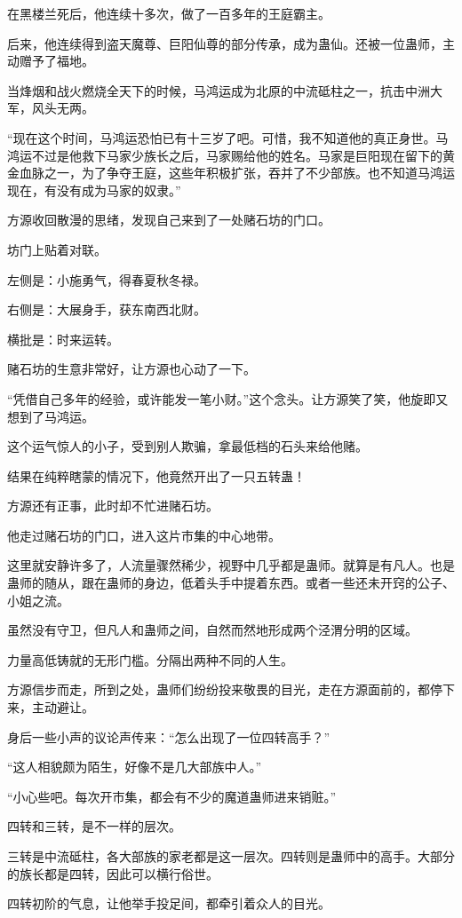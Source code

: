 \begin{this_body}
在黑楼兰死后，他连续十多次，做了一百多年的王庭霸主。

后来，他连续得到盗天魔尊、巨阳仙尊的部分传承，成为蛊仙。还被一位蛊师，主动赠予了福地。

当烽烟和战火燃烧全天下的时候，马鸿运成为北原的中流砥柱之一，抗击中洲大军，风头无两。

“现在这个时间，马鸿运恐怕已有十三岁了吧。可惜，我不知道他的真正身世。马鸿运不过是他救下马家少族长之后，马家赐给他的姓名。马家是巨阳现在留下的黄金血脉之一，为了争夺王庭，这些年积极扩张，吞并了不少部族。也不知道马鸿运现在，有没有成为马家的奴隶。”

方源收回散漫的思绪，发现自己来到了一处赌石坊的门口。

坊门上贴着对联。

左侧是：小施勇气，得春夏秋冬禄。

右侧是：大展身手，获东南西北财。

横批是：时来运转。

赌石坊的生意非常好，让方源也心动了一下。

“凭借自己多年的经验，或许能发一笔小财。”这个念头。让方源笑了笑，他旋即又想到了马鸿运。

这个运气惊人的小子，受到别人欺骗，拿最低档的石头来给他赌。

结果在纯粹瞎蒙的情况下，他竟然开出了一只五转蛊！

方源还有正事，此时却不忙进赌石坊。

他走过赌石坊的门口，进入这片市集的中心地带。

这里就安静许多了，人流量骤然稀少，视野中几乎都是蛊师。就算是有凡人。也是蛊师的随从，跟在蛊师的身边，低着头手中提着东西。或者一些还未开窍的公子、小姐之流。

虽然没有守卫，但凡人和蛊师之间，自然而然地形成两个泾渭分明的区域。

力量高低铸就的无形门槛。分隔出两种不同的人生。

方源信步而走，所到之处，蛊师们纷纷投来敬畏的目光，走在方源面前的，都停下来，主动避让。

身后一些小声的议论声传来：“怎么出现了一位四转高手？”

“这人相貌颇为陌生，好像不是几大部族中人。”

“小心些吧。每次开市集，都会有不少的魔道蛊师进来销赃。”

四转和三转，是不一样的层次。

三转是中流砥柱，各大部族的家老都是这一层次。四转则是蛊师中的高手。大部分的族长都是四转，因此可以横行俗世。

四转初阶的气息，让他举手投足间，都牵引着众人的目光。


\end{this_body}

